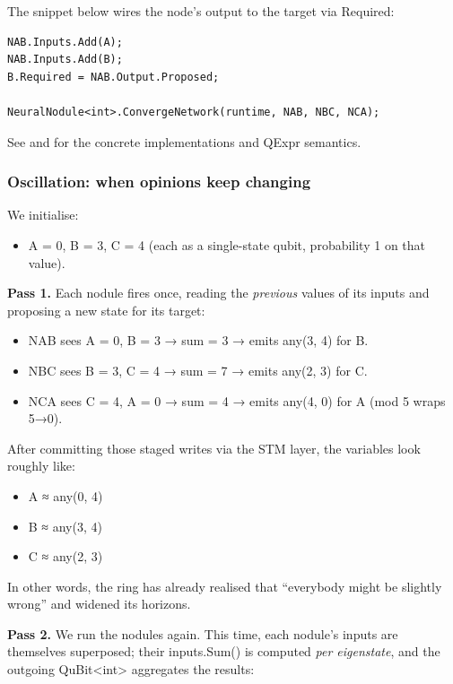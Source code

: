 \documentclass[a4paper,11pt]{article}
\begin{document}
The snippet below wires the node's output to the target via Required:

\begin{lstlisting}[style=codeblock]
NAB.Inputs.Add(A);
NAB.Inputs.Add(B);
B.Required = NAB.Output.Proposed;

NeuralNodule<int>.ConvergeNetwork(runtime, NAB, NBC, NCA);
\end{lstlisting}

See 
and 
for the concrete implementations and QExpr semantics.

\subsubsection{Oscillation: when opinions keep changing}

We initialise:

\begin{itemize}
\item
  A = 0, B = 3, C = 4 (each as a single-state qubit, probability 1 on that value).
\end{itemize}

\textbf{Pass 1.} Each nodule fires once, reading the \emph{previous} values of its inputs and proposing a new state for its target:

\begin{itemize}
\item
  NAB sees A = 0, B = 3 → sum = 3 → emits any(3, 4) for B.
\item
  NBC sees B = 3, C = 4 → sum = 7 → emits any(2, 3) for C.
\item
  NCA sees C = 4, A = 0 → sum = 4 → emits any(4, 0) for A (mod 5 wraps 5→0).
\end{itemize}

After committing those staged writes via the STM layer, the variables look roughly like:

\begin{itemize}
\item
  A ≈ any(0, 4)
\item
  B ≈ any(3, 4)
\item
  C ≈ any(2, 3)
\end{itemize}

In other words, the ring has already realised that ``everybody might be slightly wrong'' and widened its horizons.

\textbf{Pass 2.} We run the nodules again. This time, each nodule's inputs are themselves superposed; their inputs.Sum() is computed \emph{per eigenstate}, and the outgoing QuBit\textless int\textgreater{} aggregates the results:
\end{document}
